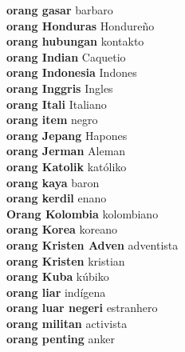 \textbf{ orang gasar  } barbaro \\
\textbf{ orang Honduras  } Hondureño \\
\textbf{ orang hubungan  } kontakto \\
\textbf{ orang Indian  } Caquetio \\
\textbf{ orang Indonesia  } Indones \\
\textbf{ orang Inggris  } Ingles \\
\textbf{ orang Itali  } Italiano \\
\textbf{ orang item  } negro \\
\textbf{ orang Jepang  } Hapones \\
\textbf{ orang Jerman  } Aleman \\
\textbf{ orang Katolik  } katóliko \\
\textbf{ orang kaya  } baron \\
\textbf{ orang kerdil  } enano \\
\textbf{ Orang Kolombia  } kolombiano \\
\textbf{ orang Korea  } koreano \\
\textbf{ orang Kristen Adven  } adventista \\
\textbf{ orang Kristen  } kristian \\
\textbf{ orang Kuba  } kúbiko \\
\textbf{ orang liar  } indígena \\
\textbf{ orang luar negeri  } estranhero \\
\textbf{ orang militan  } activista \\
\textbf{ orang penting  } anker \\

